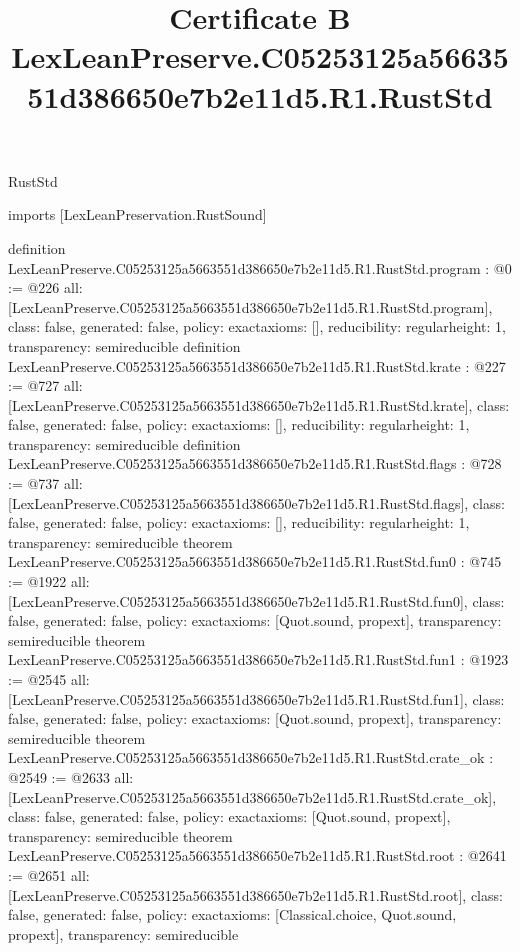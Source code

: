 \begin{lexlean}{RustStd}
\title{Certificate B LexLeanPreserve.C05253125a5663551d386650e7b2e11d5.R1.RustStd}
\begin{coremodule}
imports [LexLeanPreservation.RustSound]

definition LexLeanPreserve.C05253125a5663551d386650e7b2e11d5.R1.RustStd.program : @0 := @226 {
  all: [LexLeanPreserve.C05253125a5663551d386650e7b2e11d5.R1.RustStd.program],
  class: false,
  generated: false,
  policy: exact{axioms: []},
  reducibility: regular{height: 1},
  transparency: semireducible
}
definition LexLeanPreserve.C05253125a5663551d386650e7b2e11d5.R1.RustStd.krate : @227 := @727 {
  all: [LexLeanPreserve.C05253125a5663551d386650e7b2e11d5.R1.RustStd.krate],
  class: false,
  generated: false,
  policy: exact{axioms: []},
  reducibility: regular{height: 1},
  transparency: semireducible
}
definition LexLeanPreserve.C05253125a5663551d386650e7b2e11d5.R1.RustStd.flags : @728 := @737 {
  all: [LexLeanPreserve.C05253125a5663551d386650e7b2e11d5.R1.RustStd.flags],
  class: false,
  generated: false,
  policy: exact{axioms: []},
  reducibility: regular{height: 1},
  transparency: semireducible
}
theorem LexLeanPreserve.C05253125a5663551d386650e7b2e11d5.R1.RustStd.fun0 : @745 := @1922 {
  all: [LexLeanPreserve.C05253125a5663551d386650e7b2e11d5.R1.RustStd.fun0],
  class: false,
  generated: false,
  policy: exact{axioms: [Quot.sound, propext]},
  transparency: semireducible
}
theorem LexLeanPreserve.C05253125a5663551d386650e7b2e11d5.R1.RustStd.fun1 : @1923 := @2545 {
  all: [LexLeanPreserve.C05253125a5663551d386650e7b2e11d5.R1.RustStd.fun1],
  class: false,
  generated: false,
  policy: exact{axioms: [Quot.sound, propext]},
  transparency: semireducible
}
theorem LexLeanPreserve.C05253125a5663551d386650e7b2e11d5.R1.RustStd.crate_ok : @2549 := @2633 {
  all: [LexLeanPreserve.C05253125a5663551d386650e7b2e11d5.R1.RustStd.crate_ok],
  class: false,
  generated: false,
  policy: exact{axioms: [Quot.sound, propext]},
  transparency: semireducible
}
theorem LexLeanPreserve.C05253125a5663551d386650e7b2e11d5.R1.RustStd.root : @2641 := @2651 {
  all: [LexLeanPreserve.C05253125a5663551d386650e7b2e11d5.R1.RustStd.root],
  class: false,
  generated: false,
  policy: exact{axioms: [Classical.choice, Quot.sound, propext]},
  transparency: semireducible
}


\end{coremodule}
\end{lexlean}
